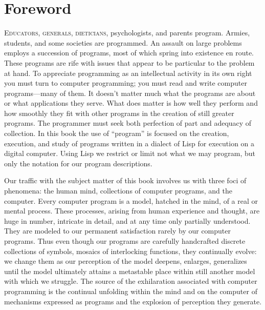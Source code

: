 \chapter*{Foreword}
\label{Foreword}


\lettrine{E}{ducators, generals, dieticians}, psychologists, and parents program.
Armies, students, and some societies are programmed.
An assault on large problems employs a succession of programs, most of which spring into existence en route.
These programs are rife with issues that appear to be particular to the problem at hand.
To appreciate programming as an intellectual activity in its own right you must turn to computer programming; you must read and write computer programs---many of them.
It doesn’t matter much what the programs are about or what applications they serve.
What does matter is how well they perform and how smoothly they fit with other programs in the creation of still greater programs.
The programmer must seek both perfection of part and adequacy of collection.
In this book the use of “program” is focused on the creation, execution, and study of programs written in a dialect of Lisp for execution on a digital computer.
Using Lisp we restrict or limit not what we may program, but only the notation for our program descriptions.

Our traffic with the subject matter of this book involves us with three foci of phenomena: the human mind, collections of computer programs, and the computer.
Every computer program is a model, hatched in the mind, of a real or mental process.
These processes, arising from human experience and thought, are huge in number, intricate in detail, and at any time only partially understood.
They are modeled to our permanent satisfaction rarely by our computer programs.
Thus even though our programs are carefully handcrafted discrete collections of symbols, mosaics of interlocking functions, they continually evolve:
we change them as our perception of the model deepens, enlarges, generalizes until the model ultimately attains a metastable place within still another model with which we struggle.
The source of the exhilaration associated with computer programming is the continual unfolding within the mind and on the computer of mechanisms expressed as programs and the explosion of perception they generate.

